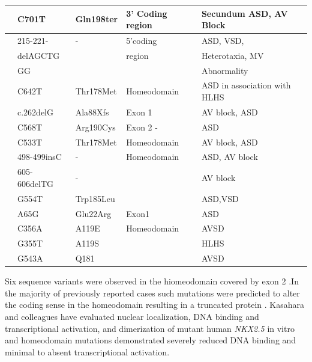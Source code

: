 \begin{refsection}
\begin{spacing}{1}
\begin{longtable}{P{0.75in} P{0.9in} P{0.85in} P{1.2in} p{1.3in}}
	 \cite{schott1998congenital}& C701T & Gln198ter & 3’ Coding region & Secundum ASD, AV Block \\ 
	  \midrule
	 & 215-221- &         - & 5’coding & ASD, VSD, \\ 
	 & delAGCTG &  & region & Heterotaxia, MV \\ 
	 & GG &  &  & Abnormality \\ \midrule
	\cite{elliott2003cardiac} & C642T & Thr178Met & Homeodomain & ASD in association with HLHS \\ \midrule
	 
	 & c.262delG & Ala88Xfs & Exon 1 & AV block, ASD \\ 
	 & C568T & Arg190Cys & Exon 2 - & ASD \\ 
	 & C533T & Thr178Met & Homeodomain & AV block, ASD \\ \midrule
	 & 498-499insC & - & Homeodomain & ASD, AV block \\ 
	 & 605-606delTG & - &  & AV block \\ 
	 & G554T & Trp185Leu &  & ASD,VSD \\ \midrule
	\cite{draus2009investigation} & A65G & Glu22Arg & Exon1 & ASD \\ \midrule
	 
	 & C356A & A119E & Homeodomain & AVSD \\ 
	 & G355T & A119S &  & HLHS \\ 
	 & G543A & Q181 &  & AVSD \\ \bottomrule
\end{longtable}
\end{spacing}

Six sequence variants were observed in the hiomeodomain covered by exon 2 .In the majority of previously reported cases such mutations were predicted to alter the coding sense in the homeodomain resulting in a truncated protein \cite{akazawa2005cardiac,benson1999mutations,goldmuntz2001nkx2}. Kasahara and colleagues \cite{kasahara2004biochemical,kasahara2000loss,kasahara2001progressive} have evaluated nuclear localization, DNA binding and transcriptional activation, and dimerization of mutant human \textit{NKX2.5} in vitro and homeodomain mutations demonstrated severely reduced DNA binding and minimal to absent transcriptional activation.


\end{refsection}
